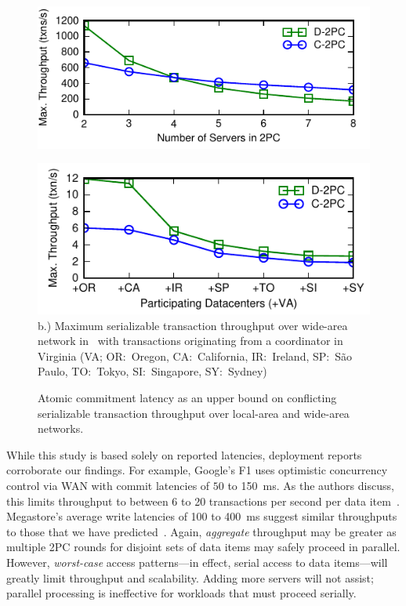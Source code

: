 \begin{figure}
  \includegraphics[width=.8\columnwidth]{figs/singledc-twopc.pdf}\\
  {\par}
  \includegraphics[width=.8\columnwidth]{figs/multidc-twopc.pdf}\\
  {\small b.) Maximum serializable transaction throughput
    over wide-area network in~\cite{hat-vldb} with transactions
    originating from a coordinator in Virginia (VA; OR:~Oregon,
    CA:~California, IR:~Ireland, SP:~S\~{a}o Paulo, TO:~Tokyo,
    SI:~Singapore, SY:~Sydney)}\vspace{1em}

  \caption{Atomic commitment latency as an upper bound on conflicting
    serializable transaction throughput over local-area and wide-area networks.}
\label{fig:2pc}
\end{figure}

While this study is based solely on reported latencies, deployment
reports corroborate our findings. For example, Google's F1 uses
optimistic concurrency control via WAN with commit latencies of $50$
to 150~ms. As the authors discuss, this limits throughput to between 6
to 20 transactions per second per data item~\cite{f1}. Megastore's
average write latencies of 100 to 400~ms suggest similar throughputs
to those that we have predicted~\cite{megastore}. Again,
\textit{aggregate} throughput may be greater as multiple 2PC rounds
for disjoint sets of data items may safely proceed in
parallel. However, \textit{worst-case} access patterns---in effect,
serial access to data items---will greatly limit throughput and
scalability. Adding more servers will not assist; parallel processing
is ineffective for workloads that must proceed serially.

